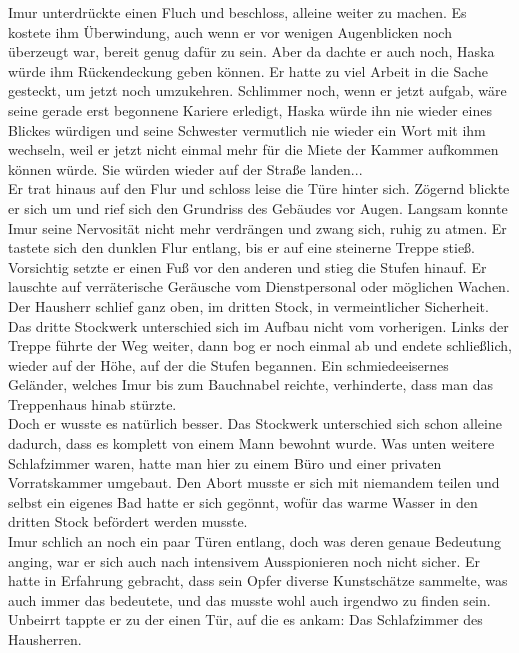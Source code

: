 Imur unterdrückte einen Fluch und beschloss, alleine weiter zu machen. Es kostete ihm Überwindung, 
auch wenn er vor wenigen Augenblicken noch überzeugt war, bereit genug dafür zu sein. Aber da 
dachte er auch noch, Haska würde ihm Rückendeckung geben können. Er hatte zu viel Arbeit in 
die Sache gesteckt, um jetzt noch umzukehren. Schlimmer noch, wenn er jetzt aufgab, wäre seine 
gerade erst begonnene Kariere erledigt, Haska würde ihn nie wieder eines Blickes würdigen und seine 
Schwester vermutlich nie wieder ein Wort mit ihm wechseln, weil er jetzt nicht einmal mehr für die 
Miete der Kammer aufkommen können würde. Sie würden wieder auf der Straße landen...\\
Er trat hinaus auf den Flur und schloss leise die Türe hinter sich. Zögernd blickte er sich um und 
rief sich den Grundriss des Gebäudes vor Augen. Langsam konnte Imur seine Nervosität nicht mehr 
verdrängen und zwang sich, ruhig zu atmen. Er tastete sich den dunklen Flur entlang, bis er auf 
eine steinerne Treppe stieß. Vorsichtig setzte er einen Fuß vor den anderen und stieg die Stufen 
hinauf. Er lauschte auf verräterische Geräusche vom Dienstpersonal oder möglichen Wachen. Der 
Hausherr schlief ganz oben, im dritten Stock, in vermeintlicher Sicherheit.\\
Das dritte Stockwerk unterschied sich im Aufbau nicht vom vorherigen. Links der Treppe führte 
der Weg weiter, dann bog er noch einmal ab und endete schließlich, wieder auf der Höhe, auf der die 
Stufen begannen. Ein schmiedeeisernes Geländer, welches Imur bis zum Bauchnabel reichte, 
verhinderte, dass man das Treppenhaus hinab stürzte.\\
Doch er wusste es natürlich besser. Das Stockwerk unterschied sich schon alleine dadurch, dass es 
komplett von einem Mann bewohnt wurde. Was unten weitere Schlafzimmer waren, hatte man hier zu 
einem Büro und einer privaten Vorratskammer umgebaut. Den Abort musste er sich mit niemandem teilen 
und selbst ein eigenes Bad hatte er sich gegönnt, wofür das warme Wasser in den dritten Stock 
befördert werden musste.\\
Imur schlich an noch ein paar Türen entlang, doch was deren genaue Bedeutung anging, war er sich 
auch nach intensivem Ausspionieren noch nicht sicher. Er hatte in Erfahrung gebracht, dass sein 
Opfer diverse Kunstschätze sammelte, was auch immer das bedeutete, und das musste wohl auch 
irgendwo zu finden sein. \\
Unbeirrt tappte er zu der einen Tür, auf die es ankam: Das Schlafzimmer des Hausherren.\\
